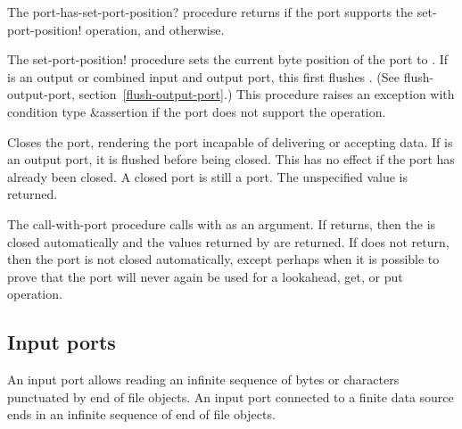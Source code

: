\begin{entry}{%
}

   
The {\cf port-has-set-port-position?} procedure returns \schtrue{} if the port
supports the {\cf set-port-position!} operation, and \schfalse{}
otherwise.
   
The {\cf set-port-position!} procedure sets the current byte position
of the port to .  If  is an output or combined
input and output port, this first flushes .  (See {\cf
  flush-output-port}, section~\ref{flush-output-port}.)
This procedure raises an exception with condition type {\cf\&assertion}
if the port does not support the operation.
\end{entry}

\begin{entry}{%
}
   
Closes the port, rendering the port incapable of delivering or
accepting data. If  is an output port, it is flushed before
being closed.  This has no effect if the port has already been closed.
A closed port is still a port. The unspecified value is returned.
\end{entry}

\begin{entry}{%
}
   
  The {\cf call-with-port} procedure
calls  with  as an argument. If
 returns, then the  is closed automatically and
the values returned by  are returned. If  does not
return, then the port is not closed automatically, except perhaps when it is
possible to prove that the port will never again be used for a
{\cf lookahead}, {\cf get}, or {\cf put} operation.
\end{entry}

\subsection{Input ports}

An input port allows reading an infinite sequence of bytes
or characters punctuated
by end of file objects. An input port connected to a finite data
source ends in an infinite sequence of end of file objects.

